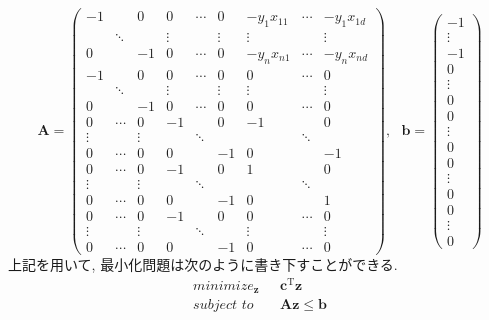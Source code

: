 \documentclass[a4paper,10pt]{jsarticle}
\begin{document}
\begin{equation*}
 \bm{A} = \left(\begin{array}{ccccccccc}
           -1 & & 0 & 0 & \cdots & 0 & -y_1x_{11} & \cdots & -y_1x_{1d} \\
            & \ddots &  & \vdots & & \vdots & \vdots &  & \vdots \\
           0 & & -1 & 0 & \cdots & 0 & -y_nx_{n1} & \cdots & -y_nx_{nd}\\
           -1 & & 0 & 0 & \cdots & 0 & 0 & \cdots & 0 \\
            & \ddots & & \vdots & & \vdots & \vdots & & \vdots \\
           0 & & -1 & 0 & \cdots & 0 & 0 & \cdots & 0\\
           0 & \cdots & 0 & -1 &  & 0 & -1 & & 0\\
           \vdots & & \vdots & & \ddots &  & & \ddots & \\
           0 & \cdots & 0 & 0 & & -1 & 0 & & -1\\
           0 & \cdots & 0 & -1 &  & 0 & 1 & & 0\\
           \vdots & & \vdots & & \ddots &  & & \ddots & \\
           0 & \cdots & 0 & 0 & & -1 & 0 & & 1\\
           0 & \cdots & 0 & -1 &  & 0 & 0 & \cdots & 0\\
           \vdots & & \vdots & & \ddots &  & \vdots & & \vdots \\
           0 & \cdots & 0 & 0 & & -1 & 0 & \cdots & 0
                \end{array}\right), \,\,\,\,
 \bm{b} = \left(\begin{array}{c}
           -1\\ \vdots \\ -1 \\
           0\\ \vdots \\ 0 \\
           0\\ \vdots \\ 0 \\
           0\\ \vdots \\ 0 \\
           0\\ \vdots \\ 0
                \end{array}\right)
\end{equation*}
上記を用いて, 最小化問題は次のように書き下すことができる.
\begin{align*}
 minimize_{\bm{z}} \,\,\,\,
 & \bm{c}^\mathrm{T}\bm{z}\\
 subject \,\, to \,\,\,\, &\bm{A}\bm{z} \leq \bm{b}
\end{align*}
\end{document}
